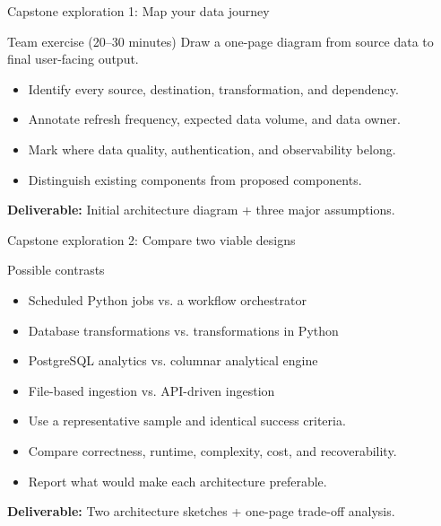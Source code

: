 \documentclass[aspectratio=43,10pt]{beamer}
\begin{document}
\begin{frame}{Capstone exploration 1: Map your data journey}
\begin{block}{Team exercise (20--30 minutes)}
Draw a one-page diagram from source data to final user-facing output.
\end{block}
\begin{itemize}
  \item Identify every source, destination, transformation, and dependency.
  \item Annotate refresh frequency, expected data volume, and data owner.
  \item Mark where data quality, authentication, and observability belong.
  \item Distinguish existing components from proposed components.
\end{itemize}
\textbf{Deliverable:} Initial architecture diagram + three major assumptions.
\end{frame}

\begin{frame}{Capstone exploration 2: Compare two viable designs}
\begin{block}{Possible contrasts}
\begin{itemize}
  \item Scheduled Python jobs vs. a workflow orchestrator
  \item Database transformations vs. transformations in Python
  \item PostgreSQL analytics vs. columnar analytical engine
  \item File-based ingestion vs. API-driven ingestion
\end{itemize}
\end{block}
\begin{itemize}
  \item Use a representative sample and identical success criteria.
  \item Compare correctness, runtime, complexity, cost, and recoverability.
  \item Report what would make each architecture preferable.
\end{itemize}
\textbf{Deliverable:} Two architecture sketches + one-page trade-off analysis.
\end{frame}
\end{document}
